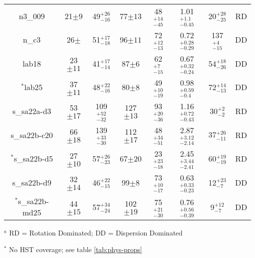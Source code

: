 \documentclass[fleqn,usenatbib]{mn2e}
\begin{document}
\begin{table*}
\begin{threeparttable}
\begin{tabular}{cccccccc}
n3\_009         & 21$\pm9$                    & 49$^{+26}_{-16}$                     & 77$\pm13$                  & 48$^{+14}_{-45}$          & 1.01$^{+1.1}_{-0.45}$                & 20$^{+28}_{-25}$  & RD   \\
n\_c3           & 26$\pm$                    & 51$^{+17}_{-18}$                     & 96$\pm11$                  & 72$^{+12}_{-13}$          & 0.72$^{+0.28}_{-0.29}$                & 137$^{+4}_{-15}$  & DD  \\
lab18           & 23$\pm11$                   & 41$^{+17}_{-14}$                     & 87$\pm6$                  & 62$^{+7}_{-15}$           & 0.67$^{+0.32}_{-0.24}$                 & 54$^{+18}_{-26}$ & DD    \\
$^{*}$lab25           & 37$\pm11$                    & 48$^{+22}_{-16}$                     & 80$\pm8$                  & 49$^{+10}_{-19}$          & 0.98$^{+0.59}_{-0.4}$                & 72$^{+14}_{-13}$ & DD   \\
s\_sa22a-d3     & 53$\pm17$                    & 109$^{+52}_{-32}$                    & 127$\pm13$                 & 93$^{+20}_{-36}$          & 1.16$^{+0.72}_{-0.43}$               & 30$^{+2}_{-2}$ & RD    \\
s\_sa22b-c20    & 66$\pm18$                    & 139$^{+33}_{-30}$                    & 112$\pm17$                 & 48$^{+34}_{-51}$          & 2.87$^{+3.12}_{-2.14}$                & 37$^{+26}_{-11}$ & RD   \\
$^{*}$s\_sa22b-d5     & 27$\pm10$                    & 57$^{+26}_{-23}$                     & 67$\pm20$                  & 23$^{+23}_{-18}$          & 2.45$^{+3.44}_{-2.41}$               & 60$^{+19}_{-19}$ & RD   \\
s\_sa22b-d9     & 32$\pm14$                    & 46$^{+22}_{-15}$                     & 99$\pm8$                  & 73$^{+10}_{-17}$             & 0.63$^{+0.33}_{-0.23}$                 & 12$^{+23}_{-7}$ & DD   \\
$^{*}$s\_sa22b-md25   & 44$\pm15$           & 57$^{+34}_{-24}$                     & 102$\pm19$   & 75$^{+21}_{-30}$                   & 0.76$^{+0.56}_{-0.39}$                & 9$^{+12}_{-7}$ & DD

\end{tabular}
\begin{tablenotes}
      \small
      \item $^{a}$ RD = Rotation Dominated; DD = Dispersion Dominated
      \item $^{*}$ No HST coverage; see table \ref{tab:phys-props}
    \end{tablenotes}
  \end{threeparttable}
  \end{table*}
\end{document}
